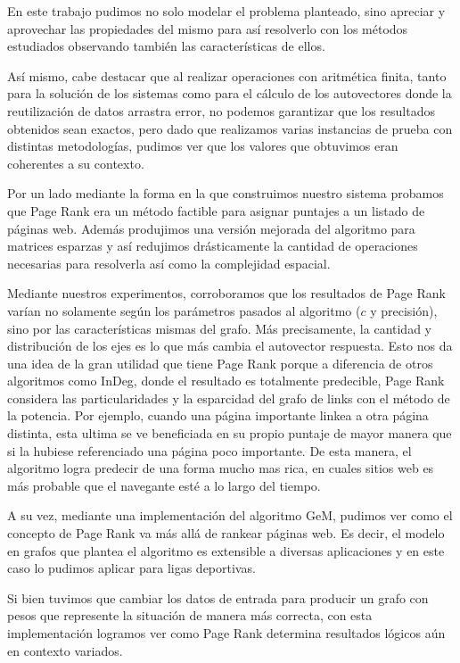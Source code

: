 \setlength{\parindent}{15.0pt} %
En este trabajo pudimos no solo modelar el problema planteado, sino 
apreciar y aprovechar las propiedades del mismo para así resolverlo con los
métodos estudiados observando también las características de ellos.

Así mismo, cabe destacar que al realizar operaciones con aritmética finita,
tanto para la solución de los sistemas como para el cálculo de los autovectores donde
 la reutilización de datos arrastra error, no podemos
garantizar que los resultados obtenidos sean exactos, pero dado que
realizamos varias instancias de prueba con distintas
metodologías, pudimos ver que los
valores que obtuvimos eran coherentes a su contexto.

Por un lado mediante la forma en la que construimos nuestro sistema probamos
que Page Rank era un método factible para asignar puntajes a un listado de páginas web. Además produjimos
una versión mejorada del algoritmo para matrices esparzas y así redujimos drásticamente la
cantidad de operaciones necesarias para resolverla así como la complejidad espacial.

Mediante nuestros experimentos, corroboramos que los resultados de Page Rank varían no solamente según los parámetros
pasados al algoritmo ($c$ y precisión), sino por las características mismas del grafo. Más precisamente, la cantidad y distribución de
los ejes es lo que más cambia el autovector respuesta. Esto nos da una idea de la gran utilidad que tiene Page Rank porque a diferencia de otros algoritmos
como InDeg, donde el resultado es totalmente predecible, Page Rank considera las particularidades y la esparcidad del grafo de links con el método de la potencia. Por ejemplo, cuando una página importante linkea a otra página distinta, esta ultima se ve beneficiada en su propio puntaje de mayor manera que si la hubiese referenciado una página poco importante. De esta manera, el algoritmo logra predecir de una forma mucho mas rica, en cuales sitios web es más probable que el navegante esté a lo largo del tiempo.

A su vez, mediante una implementación del algoritmo GeM, pudimos ver como el concepto de Page Rank va
más allá de rankear páginas web. Es decir, el modelo en grafos que plantea el algoritmo es extensible
a diversas aplicaciones y en este caso lo pudimos aplicar para ligas deportivas.

Si bien tuvimos que cambiar los datos de entrada para producir un grafo con pesos que represente la situación de manera más correcta, con esta implementación logramos ver como Page Rank determina resultados lógicos aún en contexto variados.


